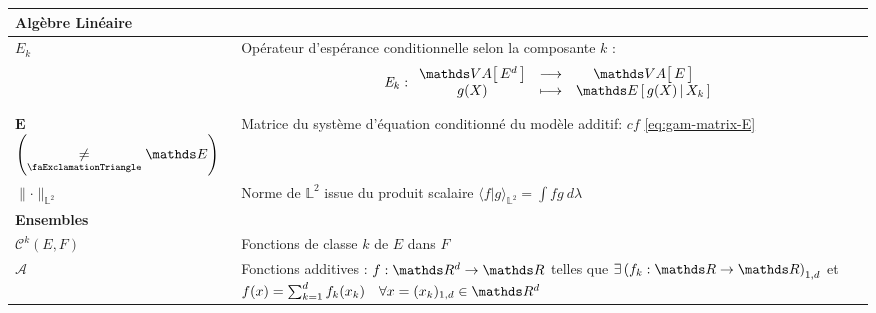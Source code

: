 \begin{tabularx}{\linewidth}{lX}
	\midrule
	\textbf{Algèbre Linéaire}                                                        &                                                                                                                                                                                                                                                     \\
	\midrule
	$\mathit{E_k}$                                                                   & Opérateur d'espérance conditionnelle selon la composante $k$ : $$\mathit E_k : \func{\VA{E^d}}{\VA{E}}{g(X)}{\esperancesachant{X_k}{g(X)}}$$                                                                                                        \\
	$\mathbf E$ $\left(\underset {\textsf{\faExclamationTriangle}} {\neq} \E\right)$ & Matrice du système d'équation conditionné du modèle additif: $cf$ \ref{eq:gam-matrix-E}                                                                                                                                                             \\
	$\lVert \cdot \rVert_{\mathds L^2}$                                              & Norme de $\mathds L^2$ issue du produit scalaire $\langle f \vert g \rangle_{\mathds L^2} = \int fg \ d\lambda$                                                                                                                                     \\
	\midrule
	\textbf{Ensembles}                                                               &                                                                                                                                                                                                                                                     \\
	\midrule
	$\mathcal C^k(E, F)$                                                             & Fonctions de classe $k$ de $E$ dans $F$                                                                                                                                                                                                             \\
	$\mathcal A$ & Fonctions \og additives \fg : $f : \R d \rightarrow \grandR$ telles que $\exists \left( f_k : \grandR \rightarrow \grandR \right)_{1,d}$ et $f(x) = \sum_{k=1}^d f_k(x_k) \quad \forall x=(x_k)_{1,d} \in \R d$\\

\end{tabularx}
